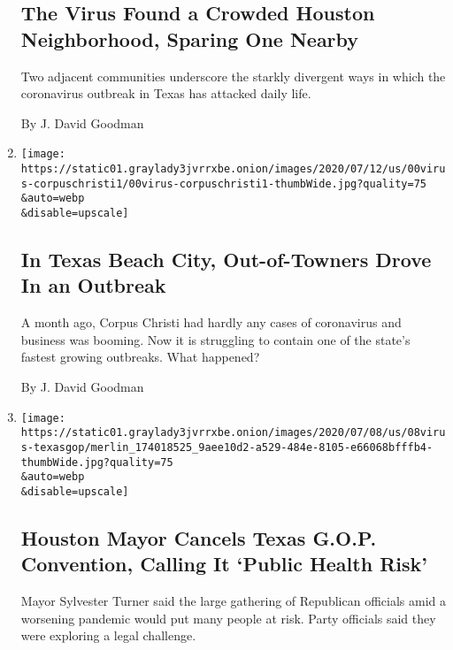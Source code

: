 \begin{enumerate}
  \hypertarget{the-virus-found-a-crowded-houston-neighborhood-sparing-one-nearby}{%
  \subsection{The Virus Found a Crowded Houston Neighborhood, Sparing
  One
  Nearby}\label{the-virus-found-a-crowded-houston-neighborhood-sparing-one-nearby}}

  Two adjacent communities underscore the starkly divergent ways in
  which the coronavirus outbreak in Texas has attacked daily life.

  By J. David Goodman
\item
  \href{/2020/07/11/us/coronavirus-texas-corpus-christi.html}{}

  \texttt{[image: https://static01.graylady3jvrrxbe.onion/images/2020/07/12/us/00virus-corpuschristi1/00virus-corpuschristi1-thumbWide.jpg?quality=75\\\&auto=webp\\\&disable=upscale]}

  \hypertarget{in-texas-beach-city-out-of-towners-drove-in-an-outbreak}{%
  \subsection{In Texas Beach City, Out-of-Towners Drove In an
  Outbreak}\label{in-texas-beach-city-out-of-towners-drove-in-an-outbreak}}

  A month ago, Corpus Christi had hardly any cases of coronavirus and
  business was booming. Now it is struggling to contain one of the
  state's fastest growing outbreaks. What happened?

  By J. David Goodman
\item
  \href{/2020/07/08/us/coronavirus-texas-republican-convention-gop.html}{}

  \texttt{[image: https://static01.graylady3jvrrxbe.onion/images/2020/07/08/us/08virus-texasgop/merlin\_174018525\_9aee10d2-a529-484e-8105-e66068bfffb4-thumbWide.jpg?quality=75\\\&auto=webp\\\&disable=upscale]}

  \hypertarget{houston-mayor-cancels-texas-gop-convention-calling-it-public-health-risk}{%
  \subsection{Houston Mayor Cancels Texas G.O.P. Convention, Calling It
  `Public Health
  Risk'}\label{houston-mayor-cancels-texas-gop-convention-calling-it-public-health-risk}}

  Mayor Sylvester Turner said the large gathering of Republican
  officials amid a worsening pandemic would put many people at risk.
  Party officials said they were exploring a legal challenge.


\end{enumerate}
